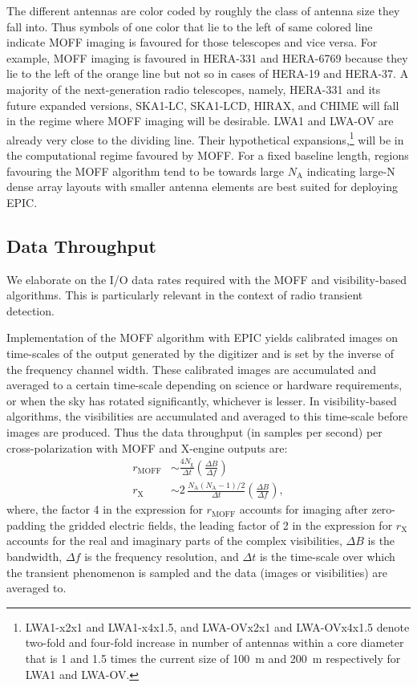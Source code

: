 \documentclass[a4paper,fleqn,usenatbib]{mnras}
\newcommand{\Nant}{N_\textrm{A}}
\newcommand{\Ngrid}{N_\textrm{g}}
\begin{document}
The different antennas are color coded by roughly the class of antenna size they fall into. Thus symbols of one color that lie to the left of same colored line indicate MOFF imaging is favoured for those telescopes and vice versa. For example, MOFF imaging is favoured in HERA-331 and HERA-6769 because they lie to the left of the orange line but not so in cases of HERA-19 and HERA-37. A majority of the next-generation radio telescopes, namely, HERA-331 and its future expanded versions, SKA1-LC, SKA1-LCD, HIRAX, and CHIME will fall in the regime where MOFF imaging will be desirable. LWA1 and LWA-OV are already very close to the dividing line. Their hypothetical expansions,\footnote{LWA1-x2x1 and LWA1-x4x1.5, and LWA-OVx2x1 and LWA-OVx4x1.5 denote two-fold and four-fold increase in number of antennas within a core diameter that is 1 and 1.5 times the current size of 100~m and 200~m respectively for LWA1 and LWA-OV.} will be in the computational regime favoured by MOFF. For a fixed baseline length, regions favouring the MOFF algorithm tend to be towards large $\Nant$ indicating large-N dense array layouts with smaller antenna elements are best suited for deploying EPIC.

\subsection{Data Throughput}

We elaborate on the I/O data rates required with the MOFF and visibility-based
algorithms. This is particularly relevant in the context of radio transient 
detection. 

Implementation of the MOFF algorithm with EPIC yields calibrated images on
time-scales of the output generated by the digitizer and is set by the inverse
of the frequency channel width. These calibrated images are accumulated and 
averaged to a certain time-scale depending on science or hardware requirements,
or when the sky has rotated significantly, whichever is lesser. In 
visibility-based algorithms, the visibilities are accumulated and averaged to 
this time-scale before images are produced. Thus the data throughput (in samples 
per second) per cross-polarization with MOFF and X-engine outputs are: 
\begin{align}
  r_\textrm{MOFF} &\sim \frac{4\Ngrid}{\Delta t} \left(\frac{\Delta B}{\Delta f}\right) \\
  r_\textrm{X} &\sim 2\,\frac{\Nant(\Nant-1)/2}{\Delta t} \left(\frac{\Delta B}{\Delta f}\right),
\end{align}
where, the factor 4 in the expression for $r_\textrm{MOFF}$ accounts for imaging
after zero-padding the gridded electric fields, the leading factor of 2 in the
expression for $r_\textrm{X}$ accounts for the real and imaginary parts of the
complex visibilities, $\Delta B$ is the bandwidth, $\Delta f$ is the frequency 
resolution, and $\Delta t$ is the time-scale over which the transient phenomenon
is sampled and the data (images or visibilities) are averaged to.
\end{document}
